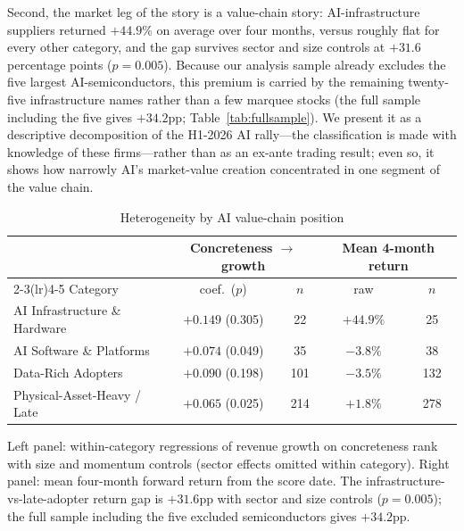 \documentclass[11pt]{article}
\begin{document}
Second, the market leg of the story is a value-chain story: AI-infrastructure
suppliers returned $+44.9\%$ on average over four months, versus roughly flat
for every other category, and the gap survives sector and size controls at
$+31.6$ percentage points ($p=0.005$). Because our analysis sample already
excludes the five largest AI-semiconductors, this premium is carried by the
remaining twenty-five infrastructure names rather than a few marquee stocks
(the full sample including the five gives $+34.2$pp;
Table~\ref{tab:fullsample}). We present it as a descriptive decomposition of
the H1-2026 AI rally---the classification is made with knowledge of these
firms---rather than as an ex-ante trading result; even so, it shows how
narrowly AI's market-value creation concentrated in one segment of the value
chain.

\begin{table}[t]
\centering
\begin{threeparttable}
\caption{Heterogeneity by AI value-chain position}
\label{tab:hetero}
\small
\begin{tabular}{lcccc}
\toprule
 & \multicolumn{2}{c}{Concreteness $\to$ growth} & \multicolumn{2}{c}{Mean 4-month return}\\
\cmidrule(lr){2-3}\cmidrule(lr){4-5}
Category & coef.\ ($p$) & $n$ & raw & $n$\\
\midrule
AI Infrastructure \& Hardware & $+0.149$ (0.305) & 22 & $+44.9\%$ & 25\\
AI Software \& Platforms & $+0.074$ (0.049) & 35 & $-3.8\%$ & 38\\
Data-Rich Adopters & $+0.090$ (0.198) & 101 & $-3.5\%$ & 132\\
Physical-Asset-Heavy / Late & $+0.065$ (0.025) & 214 & $+1.8\%$ & 278\\
\bottomrule
\end{tabular}
\begin{tablenotes}\footnotesize
\item Left panel: within-category regressions of revenue growth on
concreteness rank with size and momentum controls (sector effects omitted
within category). Right panel: mean four-month forward return from the score
date. The infrastructure-vs-late-adopter return gap is $+31.6$pp with sector
and size controls ($p=0.005$); the full sample including the five excluded
semiconductors gives $+34.2$pp.
\end{tablenotes}
\end{threeparttable}
\end{table}
\end{document}
